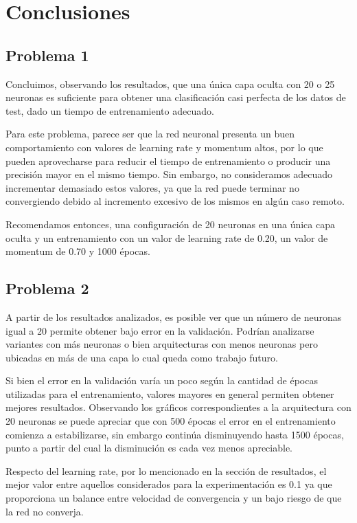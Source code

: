 \documentclass[informe.tex]{subfiles}
\begin{document}
  
  \section{Conclusiones}
    
    \subsection{Problema 1}
      
      Concluimos, observando los resultados, que una \'unica capa oculta con 20 o 25 neuronas es suficiente para obtener una clasificaci\'on casi perfecta de los datos de test, dado un tiempo de entrenamiento adecuado. 
      
      Para este problema, parece ser que la red neuronal presenta un buen comportamiento con valores de learning rate y momentum altos, por lo que pueden aprovecharse para reducir el tiempo de entrenamiento o producir una precisi\'on mayor en el mismo tiempo. Sin embargo, no consideramos adecuado incrementar demasiado estos valores, ya que la red puede terminar no convergiendo debido al incremento excesivo de los mismos en alg\'un caso remoto.
      
      Recomendamos entonces, una configuraci\'on de 20 neuronas en una \'unica capa oculta y un entrenamiento con un valor de learning rate de 0.20, un valor de momentum de 0.70 y 1000 \'epocas.
      
  
    \subsection{Problema 2}
      
      A partir de los resultados analizados, es posible ver que un número de neuronas igual a 20 permite obtener bajo error en la validación. Podrían analizarse variantes con más neuronas o bien arquitecturas con menos neuronas pero ubicadas en más de una capa lo cual queda como trabajo futuro.
      
      Si bien el error en la validación varía un poco según la cantidad de épocas utilizadas para el entrenamiento, valores mayores en general permiten obtener mejores resultados. Observando los gráficos correspondientes a la arquitectura con 20 neuronas se puede apreciar que con 500 épocas el error en el entrenamiento comienza a estabilizarse, sin embargo continúa disminuyendo hasta 1500 épocas, punto a partir del cual la disminución es cada vez menos apreciable.
      
      Respecto del learning rate, por lo mencionado en la sección de resultados, el mejor valor entre aquellos considerados para la experimentación es 0.1 ya que proporciona un balance entre velocidad de convergencia y un bajo riesgo de que la red no converja.
  
\end{document}
